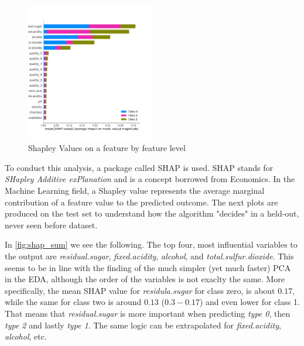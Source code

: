 \documentclass[11pt,twoside]{article}
\numberwithin{Theorem}{section}
\numberwithin{Definition}{section}
\numberwithin{Lemma}{section}
\numberwithin{Algorithm}{section}
\numberwithin{equation}{section}
\begin{document}
\vspace*{1em}
\begin{figure}[!h]
\centering
\includegraphics[width=0.5\textwidth]{./output/2.i.shap-summary.pdf}
\caption{Shapley Values on a feature by feature level}
\label{fig:shap_sum}
\end{figure}
\vspace{2em}

To conduct this analysis, a package called \textsf{SHAP} is used. \textsf{SHAP} stands for \textit{SHapley Additive exPlanation} and is a concept borrowed from Economics. In the Machine Learning field, a Shapley value represents the average marginal contribution of a feature value to the predicted outcome. The next plots are produced on the test set to understand how the algorithm "decides" in a held-out, never seen before dataset. 

In \autoref{fig:shap_sum} we see the following. The top four, most influential variables to the output are \textit{residual.sugar}, \textit{fixed.acidity}, \textit{alcohol}, and \textit{total.sulfur.dioxide}. This seems to be in line with the finding of the much simpler (yet much faster) PCA in the EDA, although the order of the variables is not exaclty the same. More specifically, the mean SHAP value for \textit{residula.sugar} for class zero, is about $0.17$, while the same for class two is around $0.13$ ($0.3 - 0.17$) and even lower for class 1. That means that \textit{residual.sugar} is more important when predicting \textit{type 0}, then \textit{type 2} and lastly \textit{type 1}. The same logic can be extrapolated for \textit{fixed.acidity}, \textit{alcohol}, etc.
\end{document}
